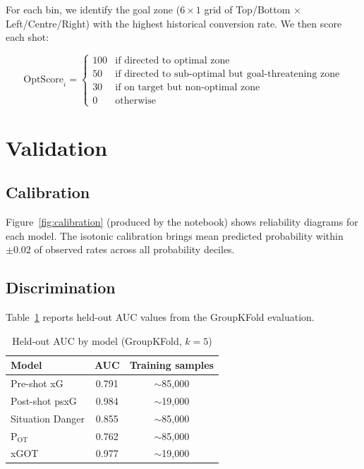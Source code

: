 \documentclass[12pt,a4paper]{article}
\begin{document}
For each bin, we identify the goal zone ($6 \times 1$ grid of Top/Bottom $\times$ Left/Centre/Right) with the highest historical conversion rate. We then score each shot:

\begin{equation}
\text{OptScore}_i =
\begin{cases}
100 & \text{if directed to optimal zone} \\
50  & \text{if directed to sub-optimal but goal-threatening zone} \\
30  & \text{if on target but non-optimal zone} \\
0   & \text{otherwise}
\end{cases}
\end{equation}

\section{Validation}
\label{sec:validation}

\subsection{Calibration}

Figure~\ref{fig:calibration} (produced by the notebook) shows reliability diagrams for each model. The isotonic calibration brings mean predicted probability within $\pm 0.02$ of observed rates across all probability deciles.

\subsection{Discrimination}

Table~\ref{tab:auc} reports held-out AUC values from the GroupKFold evaluation.

\begin{table}[H]
\centering
\caption{Held-out AUC by model (GroupKFold, $k=5$)}
\label{tab:auc}
\begin{tabular}{lcc}
\toprule
\textbf{Model} & \textbf{AUC} & \textbf{Training samples} \\
\midrule
Pre-shot xG        & 0.791 & $\sim$85,000 \\
Post-shot psxG     & 0.984 & $\sim$19,000 \\
Situation Danger   & 0.855 & $\sim$85,000 \\
P$_{\text{OT}}$    & 0.762 & $\sim$85,000 \\
xGOT               & 0.977 & $\sim$19,000 \\
\bottomrule
\end{tabular}
\end{table}
\end{document}

